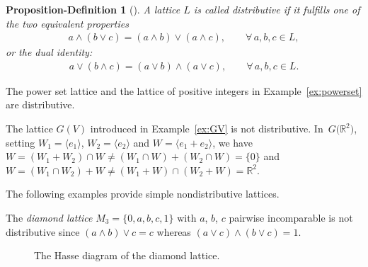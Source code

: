 \documentclass[pdftex]{sigma}
\numberwithin{equation}{section}
\newtheorem{propdefn}[Theorem]{Proposition-Definition}
 { \theoremstyle{definition}
\newtheorem{Definition}[Theorem]{Definition}
\newtheorem{Note}[Theorem]{Note}
\newtheorem{Example}[Theorem]{Example}
\newtheorem{Remark}[Theorem]{Remark}
	\newtheorem{coex}[Theorem]{Counterexample}
}
\newcommand{\R}{\mathbb{R}}
\begin{document}
\begin{propdefn}[{\cite[Section 4, Lemma 10]{Gra2}}] \label{propdef:distrib1}
A lattice $L$ is called distributive if it fulfills one of the two equivalent properties
 \begin{gather}\label{eq:distr1}
 a\wedge (b\vee c)= (a\wedge b)\vee (a\wedge c), \qquad \forall\, a,b, c\in L,
 \end{gather}
 or the dual identity:
 \begin{gather*}%
 a\vee (b\wedge c)= (a\vee b)\wedge(a\vee c), \qquad \forall\, a,b, c\in L.
 \end{gather*}
 \end{propdefn}

 \begin{Example} The power set lattice and the lattice of positive integers in Example~\ref{ex:powerset} are distributive.
 \end{Example}

\begin{coex} \label{coex:GR2} The \subsp lattice $G(V)$ introduced in Example~\ref{ex:GV} is not distributive. In~$G\big(\R^2\big)$, setting $W_1= \langle e_1\rangle$, $W_2= \langle e_2\rangle$ and $W=\langle e_1+e_2\rangle$, we have
	$W=(W_1+ W_2)\cap W\neq (W_1\cap W)+ (W_2\cap W)=\{0\}$ and $W=(W_1 \cap W_2)+ W\neq (W_1+ W)\cap (W_2+ W)=\R^2$.
\end{coex}

The following examples provide simple nondistributive lattices.

\newpage

\begin{Example}\label{ex:diamond}
	The {\it diamond lattice} $M_3=\{0,a,b ,c,1\}$ with $a$, $b$, $c$ pairwise incomparable is not distributive since $(a\wedge b)\vee c= c$ whereas
$(a\vee c)\wedge (b\vee c)= 1$.
\begin{figure}[h!]\centering
{}
\caption{The Hasse diagram of the diamond lattice.}
\end{figure}
\end{Example}
\end{document}
